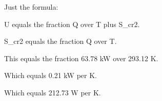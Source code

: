 Just the formula:

U equals the fraction Q over T plus S_cr2.

S_cr2 equals the fraction Q over T.

This equals the fraction 63.78 kW over 293.12 K.

Which equals 0.21 kW per K.

Which equals 212.73 W per K.